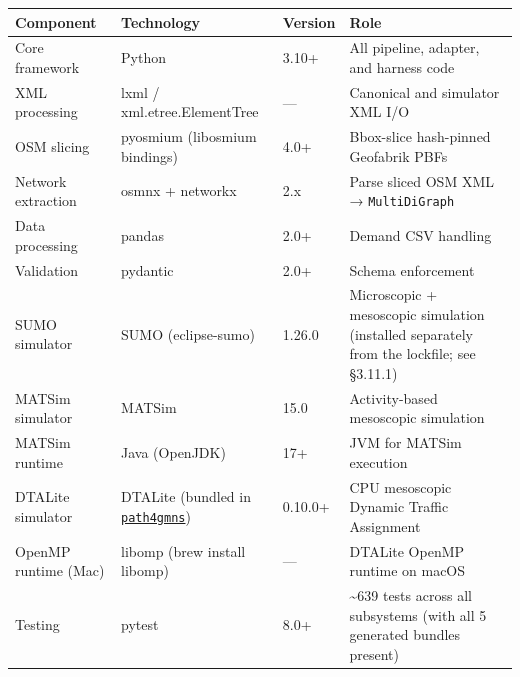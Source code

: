 \begin{longtable}[]{@{}llll@{}}
\toprule\noalign{}
Component & Technology & Version & Role \\
\midrule\noalign{}
\endhead
\bottomrule\noalign{}
\endlastfoot
Core framework & Python & 3.10+ & All pipeline, adapter, and harness
code \\
XML processing & lxml / xml.etree.ElementTree & --- & Canonical and
simulator XML I/O \\
OSM slicing & pyosmium (libosmium bindings) & 4.0+ & Bbox-slice
hash-pinned Geofabrik PBFs \\
Network extraction & osmnx + networkx & 2.x & Parse sliced OSM XML →
\texttt{MultiDiGraph} \\
Data processing & pandas & 2.0+ & Demand CSV handling \\
Validation & pydantic & 2.0+ & Schema enforcement \\
SUMO simulator & SUMO (eclipse-sumo) & 1.26.0 & Microscopic + mesoscopic
simulation (installed separately from the lockfile; see §3.11.1) \\
MATSim simulator & MATSim & 15.0 & Activity-based mesoscopic
simulation \\
MATSim runtime & Java (OpenJDK) & 17+ & JVM for MATSim execution \\
DTALite simulator & DTALite (bundled in
\href{https://github.com/jdlph/Path4GMNS}{\texttt{path4gmns}}) & 0.10.0+
& CPU mesoscopic Dynamic Traffic Assignment \\
OpenMP runtime (Mac) & libomp (brew install libomp) & --- & DTALite
OpenMP runtime on macOS \\
Testing & pytest & 8.0+ & \textasciitilde639 tests across all subsystems
(with all 5 generated bundles present) \\
\end{longtable}

